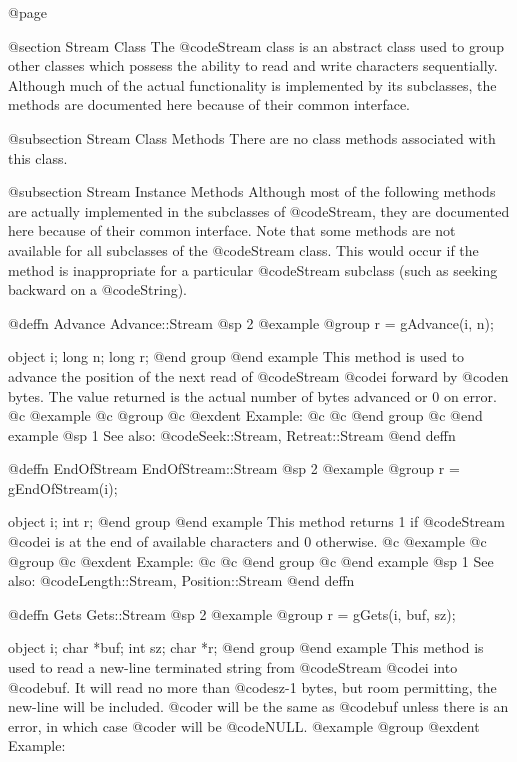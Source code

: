 @page

@section Stream Class
The @code{Stream} class is an abstract class used to group other classes
which possess the ability to read and write characters sequentially.
Although much of the actual functionality is implemented by its
subclasses, the methods are documented here because of their common
interface.

@subsection Stream Class Methods
There are no class methods associated with this class.


@subsection Stream Instance Methods
Although most of the following methods are actually implemented in the
subclasses of @code{Stream}, they are documented here because of their
common interface.  Note that some methods are not available for all
subclasses of the @code{Stream} class.  This would occur if the method
is inappropriate for a particular @code{Stream} subclass (such as
seeking backward on a @code{String}).





@deffn {Advance} Advance::Stream
@sp 2
@example
@group
r = gAdvance(i, n);

object  i;
long    n;
long    r;
@end group
@end example
This method is used to advance the position of the next
read of @code{Stream} @code{i} forward by @code{n} bytes.
The value returned is the actual number of bytes advanced or
0 on error.
@c @example
@c @group
@c @exdent Example:
@c  
@c @end group
@c @end example
@sp 1
See also:  @code{Seek::Stream, Retreat::Stream}
@end deffn








@deffn {EndOfStream} EndOfStream::Stream
@sp 2
@example
@group
r = gEndOfStream(i);

object  i;
int     r;
@end group
@end example
This method returns 1 if @code{Stream} @code{i} is at the end of available
characters and 0 otherwise.
@c @example
@c @group
@c @exdent Example:
@c  
@c @end group
@c @end example
@sp 1
See also:  @code{Length::Stream, Position::Stream}
@end deffn








@deffn {Gets} Gets::Stream
@sp 2
@example
@group
r = gGets(i, buf, sz);

object  i;
char    *buf;
int     sz;
char    *r;
@end group
@end example
This method is used to read a new-line terminated string from
@code{Stream} @code{i} into @code{buf}.  It will read no more than
@code{sz-1} bytes, but room permitting, the new-line will be included.
@code{r} will be the same as @code{buf} unless there is an error, in
which case @code{r} will be @code{NULL}.
@example
@group
@exdent Example:
  
